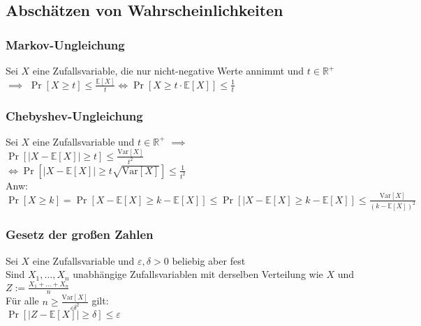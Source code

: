 \documentclass[a4paper,9pt]{extarticle}
\newcommand{\Var}{\text{Var}}
\begin{document}
\subsection*{Abschätzen von Wahrscheinlichkeiten}
\subsubsection*{Markov-Ungleichung}
Sei $X$ eine Zufallsvariable, die nur nicht-negative Werte annimmt und $t \in \mathbb{R}^+$ \\
$\implies$ $\Pr[X ≥ t] ≤ \frac{\mathbb{E}[X]}{t} \iff \Pr[X ≥ t ⋅ \mathbb{E}[X]] ≤ \frac{1}{t}$

\subsubsection*{Chebyshev-Ungleichung}
Sei $X$ eine Zufallsvariable und $t \in \mathbb{R}^+$ $\implies$ \\
$\Pr[|X - \mathbb{E}[X]| ≥ t] ≤ \frac{\Var[X]}{t^2}$ \\
$\iff \Pr[|X-\mathbb{E}[X]| ≥ t \sqrt{\Var[X]}] ≤ \frac{1}{t^2}$ \\

Anw: $\Pr[X ≥ k] = \Pr[X - \mathbb{E}[X] ≥ k - \mathbb{E}[X]] ≤ \Pr[|X - \mathbb{E}[X] ≥ k - \mathbb{E}[X]] ≤ \frac{\Var[X]}{(k-\mathbb{E}[X])^2}$

\subsubsection*{Gesetz der großen Zahlen}
Sei $X$ eine Zufallsvariable und $\varepsilon, \delta > 0$ beliebig aber fest \\
Sind $X_1, \dots, X_n$ unabhängige Zufallsvariablen mit derselben Verteilung wie $X$ und $Z := \frac{X_1 + \dots + X_n}{n}$ \\
Für alle $n ≥ \frac{\Var[X]}{\varepsilon \delta^2}$ gilt: \\
$\Pr[|Z - \mathbb{E}[X]| ≥ \delta] ≤ \varepsilon$
\end{document}
